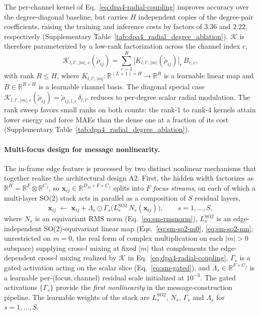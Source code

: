The per-channel kernel of Eq.~\eqref{eq:dpa4-radial-coupling} improves accuracy over the degree-diagonal baseline, but carries $H$ independent copies of the degree-pair coefficients, raising the training and inference costs by factors of $3.36$ and $2.22$, respectively (Supplementary Table~\ref{tab:dpa4_radial_degree_ablation}).
$\mathcal{K}$ is therefore parameterized by a low-rank factorization across the channel index $c$,
\begin{equation}
    \mathcal{K}_{l,l',|m|,c}(\widetilde{\rho}_{ij})
    =
    \sum_{r=1}^{R}
    \bigl[K_{l,l',|m|}(\widetilde{\rho}_{ij})\bigr]_{r}\,B_{r,c},
    \label{eq:dpa4-K-lowrank}
\end{equation}
with rank $R\leq H$, where $K_{l,l',|m|}:\mathbb{R}^{(L+1)\times H}\to\mathbb{R}^{R}$ is a learnable linear map and $B\in\mathbb{R}^{R\times H}$ is a learnable channel basis.
The diagonal special case $\mathcal{K}_{l,l',|m|,c}(\widetilde{\rho}_{ij})=\widetilde{\rho}_{ij,l,c}\, \delta_{l,l'}$ reduces to per-degree scalar radial modulation.
The rank sweep favors small ranks on both counts: the rank-1 to rank-4 kernels attain lower energy and force MAEs than the dense one at a fraction of its cost (Supplementary Table~\ref{tab:dpa4_radial_degree_ablation}).

\paragraph{Multi-focus design for message nonlinearity.}
The in-frame edge feature is processed by two distinct nonlinear mechanisms that together realize the architectural design A2.
First, the hidden width
factorizes as $\mathbb{R}^{H}=\mathbb{R}^{F}\otimes \mathbb{R}^{C_f}$, so
$\mathbf{x}_{ij}\in\mathbb{R}^{D_M\times F\times C_f}$ splits into $F$
\emph{focus streams}, on each of which a multi-layer SO(2) stack acts in
parallel as a composition of $S$ residual layers,
\begin{equation}
    \mathbf{x}_{ij}\;\leftarrow\;
    \mathbf{x}_{ij}+\Lambda_s\odot
    \Gamma_s\!\bigl(L^{\mathrm{SO2}}_s\,N_s(\mathbf{x}_{ij})\bigr),
    \qquad s=1,\dots,S,
    \label{eq:dpa4-so2-layer}
\end{equation}
where $N_s$ is an equivariant RMS norm
(Eq.~\eqref{eq:sm-rmsnorm}), $L^{\mathrm{SO2}}_s$ is an
edge-independent SO(2)-equivariant linear map
(Eqs.~\eqref{eq:sm-so2-m0}, \eqref{eq:sm-so2-mn}; unrestricted on $m=0$,
the real form of complex multiplication on each $|m|>0$ subspace) supplying
cross-$l$ mixing at fixed $|m|$ that complements the edge-dependent
cross-$l$ mixing realized by $\mathcal{K}$ in
Eq.~\eqref{eq:dpa4-radial-coupling}, $\Gamma_s$ is a gated activation acting on
the scalar slice (Eq.~\eqref{eq:sm-gated}), and
$\Lambda_s\in\mathbb{R}^{F\times C_f}$ is a learnable
per-(focus,\,channel) residual scale initialized at $10^{-3}$.
The gated activations $\{\Gamma_s\}$ provide the \emph{first nonlinearity} in the message-construction pipeline.
The learnable weights of the stack are $L^{\mathrm{SO2}}_s$, $N_s$, $\Gamma_s$ and $\Lambda_s$ for $s=1,\dots,S$.

